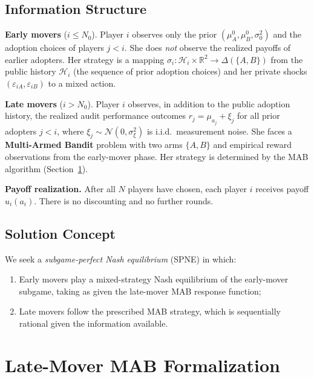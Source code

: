 \documentclass[12pt,a4paper]{article}
\newcommand{\R}{\mathbb{R}}
\newcommand{\cH}{\mathcal{H}}
\begin{document}
\subsection{Information Structure}

\medskip\noindent
\textbf{Early movers} ($i\leq N_0$).  Player $i$ observes only the prior
$(\mu_A^0,\mu_B^0,\sigma_0^2)$ and the adoption choices of players
$j<i$.  She does \emph{not} observe the realized payoffs of earlier
adopters.  Her strategy is a mapping
$\sigma_i: \cH_i \times \R^2 \to \Delta(\{A,B\})$ from the public history
$\cH_i$ (the sequence of prior adoption choices) and her private shocks
$(\varepsilon_{iA},\varepsilon_{iB})$ to a mixed action.

\medskip\noindent
\textbf{Late movers} ($i>N_0$).  Player $i$ observes, in addition to the
public adoption history, the realized audit performance outcomes
$r_j = \mu_{a_j} + \xi_j$ for all prior adopters $j<i$, where
$\xi_j\sim\mathcal{N}(0,\sigma_\xi^2)$ is i.i.d.\ measurement noise.
She faces a \textbf{Multi-Armed Bandit} problem with two arms
$\{A,B\}$ and empirical reward observations from the early-mover phase.
Her strategy is determined by the MAB algorithm (Section~\ref{sec:mab}).

\medskip\noindent
\textbf{Payoff realization.}
After all $N$ players have chosen, each player $i$ receives payoff
$u_i(a_i)$.  There is no discounting and no further rounds.

\subsection{Solution Concept}

We seek a \emph{subgame-perfect Nash equilibrium} (SPNE) in which:
\begin{enumerate}[label=(\roman*)]
    \item Early movers play a mixed-strategy Nash equilibrium of the
          early-mover subgame, taking as given the late-mover MAB
          response function;
    \item Late movers follow the prescribed MAB strategy, which is
          sequentially rational given the information available.
\end{enumerate}

\section{Late-Mover MAB Formalization}
\label{sec:mab}
\end{document}
